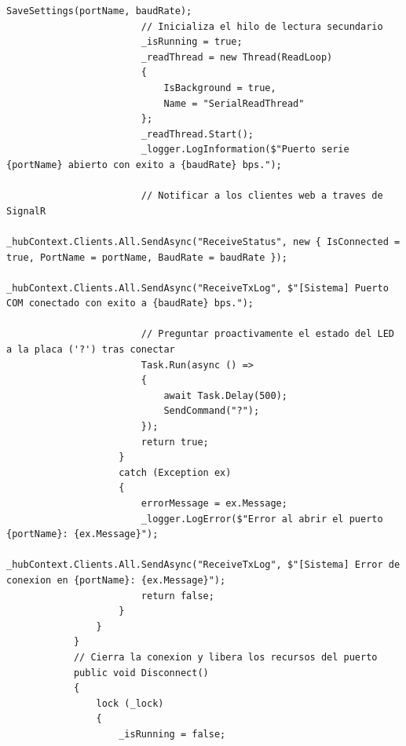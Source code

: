 \documentclass[
10pt, %
a4paper, %
oneside, %
headinclude,footinclude, %
BCOR5mm, %
]{scrartcl}
\begin{document}
\begin{lstlisting}[style=VSCodeDark, caption={Servicio de comunicacion serie en C\#}, label={lst:serial_service}]
						SaveSettings(portName, baudRate);
						// Inicializa el hilo de lectura secundario
						_isRunning = true;
						_readThread = new Thread(ReadLoop)
						{
							IsBackground = true,
							Name = "SerialReadThread"
						};
						_readThread.Start();
						_logger.LogInformation($"Puerto serie {portName} abierto con exito a {baudRate} bps.");
						
						// Notificar a los clientes web a traves de SignalR
						_hubContext.Clients.All.SendAsync("ReceiveStatus", new { IsConnected = true, PortName = portName, BaudRate = baudRate });
						_hubContext.Clients.All.SendAsync("ReceiveTxLog", $"[Sistema] Puerto COM conectado con exito a {baudRate} bps.");
						
						// Preguntar proactivamente el estado del LED a la placa ('?') tras conectar
						Task.Run(async () =>
						{
							await Task.Delay(500);
							SendCommand("?");
						});
						return true;
					}
					catch (Exception ex)
					{
						errorMessage = ex.Message;
						_logger.LogError($"Error al abrir el puerto {portName}: {ex.Message}");
						_hubContext.Clients.All.SendAsync("ReceiveTxLog", $"[Sistema] Error de conexion en {portName}: {ex.Message}");
						return false;
					}
				}
			}
			// Cierra la conexion y libera los recursos del puerto
			public void Disconnect()
			{
				lock (_lock)
				{
					_isRunning = false;
					

\end{lstlisting}
\end{document}
